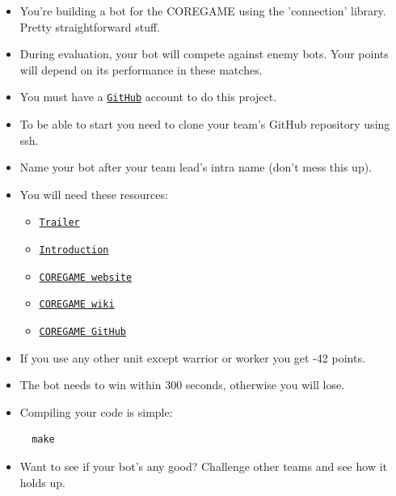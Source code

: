 \documentclass[12pt]{article}
\begin{document}
\begin{itemize}
  \item You're building a bot for the COREGAME using the 'connection' library. Pretty straightforward stuff.

  \item During evaluation, your bot will compete against enemy bots. Your points will depend on its performance in these matches.

  \item You must have a \href{https://github.com}{\texttt{GitHub}} account to do this project.

  \item To be able to start you need to clone your team's GitHub repository using ssh.

  \item Name your bot after your team lead's intra name (don't mess this up).

  \item You will need these resources:
  \begin{itemize}
    \item \href{https://youtu.be/gMmBgHnb8Nc?si=Thm0HOCfNIZbfCnI}{\texttt{Trailer}}
    \item \href{https://shattereddisk.github.io/rickroll/rickroll.mp4}{\texttt{Introduction}}
    \item \href{https://coregame.de}{\texttt{COREGAME website}}
    \item \href{https://42core-team.github.io/rush02-wiki/#/}{\texttt{COREGAME wiki}}
    \item \href{https://github.com/42core-team}{\texttt{COREGAME GitHub}}
  \end{itemize}

  \item If you use any other unit except warrior or worker you get -42 points.

  \item The bot needs to win within 300 seconds, otherwise you will lose.

  \newpage

  \item Compiling your code is simple:

  \begin{verbatim}
  make
  \end{verbatim}

  \item Want to see if your bot's any good? Challenge other teams and see how it holds up.
\end{itemize}
\end{document}
